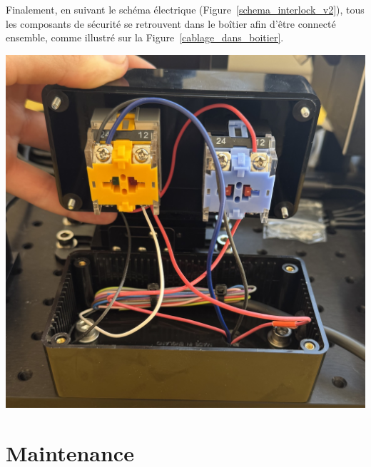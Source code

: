 \begin{minipage}[c]{0.48\textwidth}
    Finalement, en suivant le schéma électrique (Figure~\ref{schema_interlock_v2}), tous les composants de sécurité se retrouvent dans le boîtier afin d'être connecté ensemble, comme illustré sur la Figure~\ref{cablage_dans_boitier}.
\end{minipage}\hfill
\begin{minipage}[c]{0.48\textwidth}
    \begin{center}
        \includegraphics[width=\textwidth]{assets/figures/Protections_laser/Securite_electrique/cablage_dans_boitier.jpeg}
    \end{center}
    \label{cablage_dans_boitier}
\end{minipage}

\section{Maintenance}

